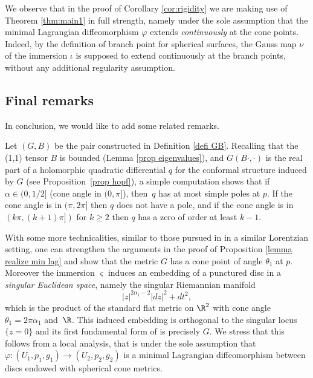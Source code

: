 We observe that in the proof of Corollary \ref{cor:rigidity} we are making use of Theorem \ref{thm:main1} in full strength, namely under the sole assumption that the minimal Lagrangian diffeomorphism $\varphi$ extends \emph{continuously} at the cone points. Indeed, by the definition of branch point for spherical surfaces, the Gauss map $\nu$ of the immersion $\iota$ is supposed to extend {continuously} at the branch points, without any additional regularity assumption.

\subsection{Final remarks}
In conclusion, we would like to add some related remarks.

\begin{remark}
Let $(G,B)$ be the pair constructed in Definition \ref{defi GB}. Recalling that the (1,1) tensor $B$ is bounded (Lemma \ref{prop eigenvalues}), and $G(B\cdot,\cdot)$ is the real part of a holomorphic quadratic differential $q$ for the conformal structure induced by $G$ (see Proposition~\ref{prop hopf}), a simple computation shows that if $\alpha\in (0,1/2]$ (\ie cone angle in $(0,\pi]$), then~$q$ has at most simple poles at $p$. If the cone angle is in $(\pi,2\pi]$ then $q$ does not have a pole, and if the cone angle is in $(k\pi,(k+1)\pi])$ for $k\geq 2$ then $q$ has a zero of order at least $k-1$.
\end{remark}

\begin{remark}\label{rmk same cone angles}
With some more technicalities, similar to those pursued in \hbox{\cite[\S 4]{zbMATH06561539}} in a similar Lorentzian setting, one can strengthen the arguments in the proof of Proposition \ref{lemma realize min lag} and show that the metric $G$ has a cone point of angle $\theta_1$ at $p$. Moreover the immersion $\varsigma$ induces an embedding of a punctured disc in a \emph{singular Euclidean space}, namely the singular Riemannian manifold
\[
|z|^{2\alpha_1-2}|dz|^2+dt^2,
\]
which is the product of the standard flat metric on $\R^2$ with cone angle $\theta_1=2\pi\alpha_1$ and~$\R$. This induced embedding is orthogonal to the singular locus $\{z=0\}$ and its first fundamental form of is precisely $G$.
We stress that this follows from a local analysis, that is under the sole assumption that $\varphi:(U_1,p_1,g_1)\to (U_2,p_2,g_2)$ is a minimal Lagrangian diffeomorphism between discs endowed with spherical cone metrics.
\end{remark}

